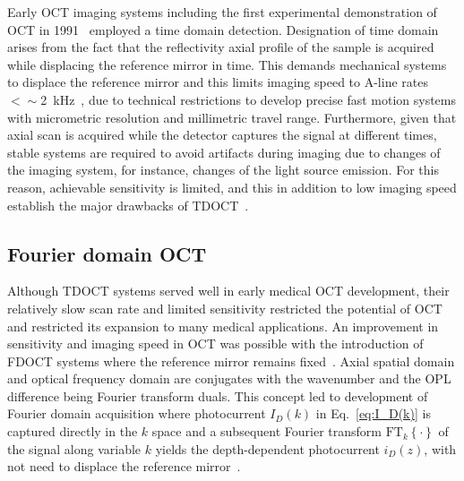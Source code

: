 Early OCT imaging systems including the first experimental demonstration of OCT in 1991~\cite{Huang1991_Optical} employed a time domain detection. Designation of time domain arises from the fact that the reflectivity axial profile of the sample is acquired while displacing the reference mirror in time. This demands mechanical systems to displace the reference mirror and this limits imaging speed to A-line rates $<\sim$2~kHz~\cite{Izatt2015_Theory}, due to technical restrictions to develop precise fast motion systems with micrometric resolution and millimetric travel range. Furthermore, given that axial scan is acquired while the detector captures the signal at different times, stable systems are required to avoid artifacts during imaging due to changes of the imaging system, for instance, changes of the light source emission. For this reason, achievable sensitivity is limited, and this in addition to low imaging speed establish the major drawbacks of TDOCT~\cite{Leitgeb2003_Performance}.

\subsection{Fourier domain OCT}

Although TDOCT systems served well in early medical OCT development, their relatively slow scan rate and limited sensitivity restricted the potential of OCT and restricted its expansion to many medical applications. An improvement in sensitivity and imaging speed in OCT was possible with the introduction of FDOCT systems where the reference mirror remains fixed~\cite{Choma2003_Sensitivity, Leitgeb2003_Performance, deBoer2003_Improved}. Axial spatial domain and optical frequency domain are conjugates with the wavenumber and the OPL difference being Fourier transform duals. This concept led to development of Fourier domain acquisition where photocurrent $I_D(k)$ in Eq.~\eqref{eq:I_D(k)} is captured directly in the $k$ space and a subsequent Fourier transform $\text{FT}_k\left\{\cdot\right\}$ of the signal  along variable $k$ yields the depth-dependent photocurrent $i_D(z)$, with not need to displace the reference mirror~\cite{Fercher1995_Measurement}.

